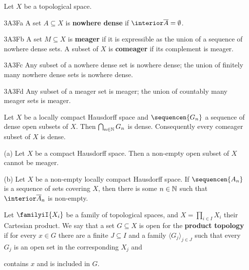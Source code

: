  Let $X$ be a topological space.

\spheader 3A3Fa A set $A\subseteq X$ is {\bf nowhere dense}
if $\interior\overline{A}=\emptyset$.

\spheader 3A3Fb A set $M\subseteq X$ is {\bf meager}
if it is expressible as the union of a sequence of nowhere
dense sets.   A subset of $X$ is {\bf comeager} if its complement is
meager.

\spheader 3A3Fc Any subset of a nowhere dense set is nowhere dense;  the
union of finitely many nowhere dense sets is nowhere dense.

\spheader 3A3Fd Any subset of a meager set is meager;  the union of
countably many meager sets is meager.   

 Let
$X$ be a locally compact Hausdorff space and $\sequencen{G_n}$ a
sequence of dense open
subsets of $X$.   Then $\bigcap_{n\in\Bbb N}G_n$ is dense.
\cmmnt{$*$} 
Consequently every comeager subset of $X$ is dense.

 (a) Let $X$ be a compact Hausdorff space.
Then a non-empty open subset of $X$ cannot be meager.

(b) Let $X$ be a non-empty locally compact Hausdorff space.   If
$\sequencen{A_n}$ is a sequence of sets covering $X$, then there is some
$n\in\Bbb N$ such that $\interior\overline{A}_n$ is non-empty.

 Let $\familyiI{X_i}$
be a family of topological spaces, and
$X=\prod_{i\in I}X_i$ their Cartesian product.   We say that a set
$G\subseteq X$ is open for the {\bf product topology} if for every $x\in
G$ there are a finite $J\subseteq I$ and a family $\langle
G_j\rangle_{j\in J}$ such that every $G_j$ is an open set in the
corresponding $X_j$ and


\noindent contains $x$ and is included in $G$.


